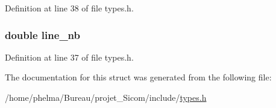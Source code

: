 Definition at line 38 of file types.\-h.

\hypertarget{struct__lexeme___a808a37180ef5a21555b2f0f68cf73cb6}{
\subsubsection[{line\-\_\-nb}]{\setlength{\rightskip}{0pt plus 5cm}double line\-\_\-nb}}\label{struct__lexeme___a808a37180ef5a21555b2f0f68cf73cb6}


Definition at line 37 of file types.\-h.



The documentation for this struct was generated from the following file\-:\begin{DoxyCompactItemize}
\item 
/home/phelma/\-Bureau/projet\-\_\-\-Sicom/include/\hyperlink{types_8h}{types.\-h}\end{DoxyCompactItemize}
